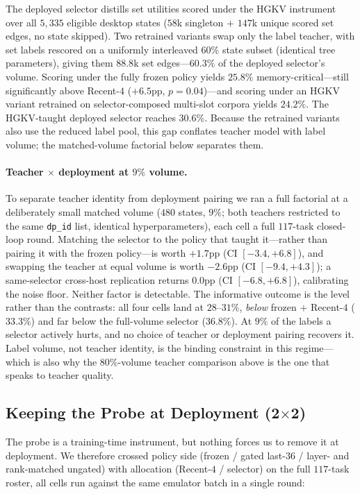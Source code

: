 \documentclass[letterpaper]{article} %
\newcommand{\hgkv}{\textsc{HGKV}}
\begin{document}
The deployed selector distills set utilities scored under the \hgkv{}
instrument over all $5{,}335$ eligible desktop states ($58$k singleton
$+$ $147$k unique scored set edges, no state skipped).
Two retrained variants swap only the label teacher, with set labels
rescored on a uniformly interleaved $60\%$ state subset (identical tree
parameters), giving them $88.8$k set edges---$60.3\%$ of the deployed
selector's volume.
Scoring under the fully frozen policy yields $25.8\%$
memory-critical---still significantly above Recent-$4$ ($+6.5$pp,
$p{=}0.04$)---and scoring under an \hgkv{} variant retrained on
selector-composed multi-slot corpora yields $24.2\%$. The \hgkv{}-taught
deployed selector reaches $30.6\%$. Because the retrained variants also
use the reduced label pool, this gap conflates teacher model with label
volume; the matched-volume factorial below separates them.

\paragraph{Teacher $\times$ deployment at $9\%$ volume.}
To separate teacher identity from deployment pairing we ran a full
factorial at a deliberately small matched volume ($480$ states, $9\%$;
both teachers restricted to the same \texttt{dp\_id} list, identical
hyperparameters), each cell a full $117$-task closed-loop round.
Matching the selector to the policy that taught it---rather than pairing
it with the frozen policy---is worth $+1.7$pp (CI $[-3.4,+6.8]$), and
swapping the teacher at equal volume is worth $-2.6$pp (CI
$[-9.4,+4.3]$); a same-selector cross-host replication returns $0.0$pp
(CI $[-6.8,+6.8]$), calibrating the noise floor. Neither factor is
detectable. The informative outcome is the level rather than the
contrasts: all four cells land at $28$--$31\%$, \emph{below} frozen
$+$ Recent-$4$ ($33.3\%$) and far below the full-volume selector
($36.8\%$). At $9\%$ of the labels a selector actively hurts, and no
choice of teacher or deployment pairing recovers it. Label volume, not
teacher identity, is the binding constraint in this regime---which is
also why the $80\%$-volume teacher comparison above is the one that
speaks to teacher quality.

\subsection{Keeping the Probe at Deployment (2$\times$2)}

The probe is a training-time instrument, but nothing forces us to remove
it at deployment. We therefore crossed policy side (frozen / gated
last-$36$ / layer- and rank-matched ungated) with allocation
(Recent-$4$ / selector) on the full $117$-task roster, all cells run
against the same emulator batch in a single round:
\end{document}
